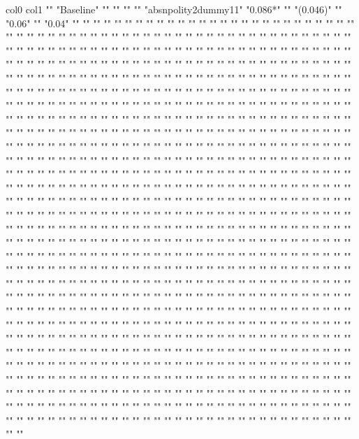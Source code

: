 col0	col1
""	"Baseline"
""	""
""	""
"absnpolity2dummy11"	"0.086*"
""	"(0.046)"
""	"0.06"
""	"0.04"
""	""
""	""
""	""
""	""
""	""
""	""
""	""
""	""
""	""
""	""
""	""
""	""
""	""
""	""
""	""
""	""
""	""
""	""
""	""
""	""
""	""
""	""
""	""
""	""
""	""
""	""
""	""
""	""
""	""
""	""
""	""
""	""
""	""
""	""
""	""
""	""
""	""
""	""
""	""
""	""
""	""
""	""
""	""
""	""
""	""
""	""
""	""
""	""
""	""
""	""
""	""
""	""
""	""
""	""
""	""
""	""
""	""
""	""
""	""
""	""
""	""
""	""
""	""
""	""
""	""
""	""
""	""
""	""
""	""
""	""
""	""
""	""
""	""
""	""
""	""
""	""
""	""
""	""
""	""
""	""
""	""
""	""
""	""
""	""
""	""
""	""
""	""
""	""
""	""
""	""
""	""
""	""
""	""
""	""
""	""
""	""
""	""
""	""
""	""
""	""
""	""
""	""
""	""
""	""
""	""
""	""
""	""
""	""
""	""
""	""
""	""
""	""
""	""
""	""
""	""
""	""
""	""
""	""
""	""
""	""
""	""
""	""
""	""
""	""
""	""
""	""
""	""
""	""
""	""
""	""
""	""
""	""
""	""
""	""
""	""
""	""
""	""
""	""
""	""
""	""
""	""
""	""
""	""
""	""
""	""
""	""
""	""
""	""
""	""
""	""
""	""
""	""
""	""
""	""
""	""
""	""
""	""
""	""
""	""
""	""
""	""
""	""
""	""
""	""
""	""
""	""
""	""
""	""
""	""
""	""
""	""
""	""
""	""
""	""
""	""
""	""
""	""
""	""
""	""
""	""
""	""
""	""
""	""
""	""
""	""
""	""
""	""
""	""
""	""
""	""
""	""
""	""
""	""
""	""
""	""
""	""
""	""
""	""
""	""
""	""
""	""
""	""
""	""
""	""
""	""
""	""
""	""
""	""
""	""
""	""
""	""
""	""
""	""
""	""
""	""
""	""
""	""
""	""
""	""
""	""
""	""
""	""
""	""
""	""
""	""
""	""
""	""
""	""
""	""
""	""
""	""
""	""
""	""
""	""
""	""
""	""
""	""
""	""
""	""
""	""
""	""
""	""
""	""
""	""
""	""
""	""
""	""
""	""
""	""
""	""
""	""
""	""
""	""
""	""
""	""
""	""
""	""
""	""
""	""
""	""
""	""
""	""
""	""
""	""
""	""
""	""
""	""
""	""
""	""
""	""
""	""
""	""
""	""
""	""
""	""
""	""
""	""
""	""
""	""
""	""
""	""
""	""
""	""
""	""
""	""
""	""
""	""
""	""
""	""
""	""
""	""
""	""
""	""
""	""
""	""
""	""
""	""
""	""
""	""
""	""
""	""
""	""
""	""
""	""
""	""
""	""
""	""
""	""
""	""
""	""
""	""
""	""
""	""
""	""
""	""
""	""
""	""
""	""
""	""
""	""
""	""
""	""
""	""
""	""
""	""
""	""
""	""
""	""
""	""
""	""
""	""
""	""
""	""
""	""
""	""
""	""
""	""
""	""
""	""
""	""
""	""
""	""
""	""
""	""
""	""
""	""
""	""
""	""
""	""
""	""
""	""
""	""
""	""
""	""
""	""
""	""
""	""
""	""
""	""
""	""
""	""
""	""
""	""
""	""
""	""
""	""
""	""
""	""
""	""
""	""
""	""
""	""
""	""
""	""
""	""
""	""
""	""
""	""
""	""
""	""
""	""
""	""
""	""
""	""
""	""
""	""
""	""
""	""
""	""
""	""
""	""
""	""
""	""
""	""
""	""
""	""
""	""
""	""
""	""
""	""
""	""
""	""
""	""
""	""
""	""
""	""
""	""
""	""
""	""
""	""
""	""
""	""
""	""
""	""
""	""
""	""
""	""
""	""
""	""
""	""
""	""
""	""
""	""
""	""
""	""
""	""
""	""
""	""
""	""
""	""
""	""
""	""
""	""
""	""
""	""
""	""
""	""
""	""
""	""
""	""
""	""
""	""
""	""
""	""
""	""
""	""
""	""
""	""
""	""
""	""
""	""
""	""
""	""
""	""
""	""
""	""
""	""
""	""
""	""
""	""
""	""
""	""
""	""
""	""
""	""
""	""
""	""
""	""
""	""
""	""
""	""
""	""
""	""
""	""
""	""
""	""
""	""
""	""
""	""
""	""
""	""
""	""
""	""
""	""
""	""
""	""
""	""
""	""
""	""
""	""
""	""
""	""
""	""
